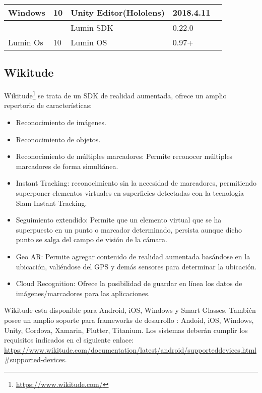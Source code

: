 \begin{table}[]
\begin{tabular}{|l|l|l|l|l|l|}
		\multirow{-3}{*}{Windows}  & \multirow{-3}{*}{10}     & \cellcolor[HTML]{EFEFEF}Unity Editor(Hololens) & \cellcolor[HTML]{EFEFEF}2018.4.11          & \multicolumn{2}{l|}{\multirow{-3}{*}{}}             \\ \hline
		&                          & Lumin SDK                                      & 0.22.0                                     & \multicolumn{2}{l|}{}                               \\ \cline{3-4}
		\multirow{-2}{*}{Lumin Os} & \multirow{-2}{*}{10}     & \cellcolor[HTML]{EFEFEF}Lumin OS               & \cellcolor[HTML]{EFEFEF}0.97+              & \multicolumn{2}{l|}{\multirow{-2}{*}{}}             \\ \hline
	\end{tabular}
\end{table}


\subsection{Wikitude}
Wikitude\footnote{\url{https://www.wikitude.com/}} se trata de un SDK de realidad aumentada, ofrece un amplio repertorio de características\cite{wikitude}: 
\begin{itemize}
	\item Reconocimiento de imágenes.
	\item Reconocimiento de objetos.
	\item Reconocimiento de múltiples marcadores: Permite reconocer múltiples marcadores de forma simultánea.
	\item Instant Tracking: reconocimiento sin la necesidad de marcadores, permitiendo superponer elementos virtuales en superficies detectadas con la tecnologia Slam Instant Tracking.
	
	\item Seguimiento extendido: Permite que un elemento virtual que se ha superpuesto en un punto o marcador determinado, persista aunque dicho punto se salga del campo de visión de la cámara.
	
	\item Geo AR: Permite agregar contenido de realidad aumentada basándose en la ubicación, valiéndose del GPS y demás sensores para determinar la ubicación.
	\item Cloud Recognition: Ofrece la posibilidad de guardar en línea los datos de imágenes/marcadores para las aplicaciones.
\end{itemize}

Wikitude esta disponible para Android, iOS, Windows y Smart Glasses.
También posee un amplio soporte para frameworks de desarrollo : Andoid, iOS, Windows, Unity, Cordova, Xamarin, Flutter, Titanium. 
Los sistemas deberán cumplir los requisitos indicados en el siguiente enlace: \url{https://www.wikitude.com/documentation/latest/android/supporteddevices.html#supported-devices}.

